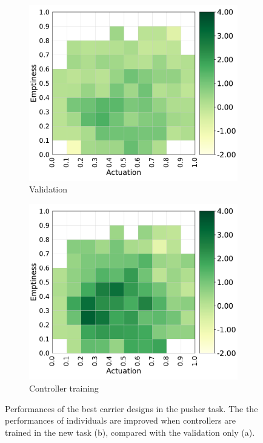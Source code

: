 \begin{figure}[H]
    \centering
    \begin{subfigure}[b]{0.49\textwidth}
         \centering
         \includegraphics[scale=0.4]{images/multitasking/carrier_val_p.pdf}
         \caption{Validation}
    \end{subfigure}
    \hfill
    \begin{subfigure}[b]{0.49\textwidth}
         \centering
         \includegraphics[scale=0.4]{images/multitasking/carrier_tr_p.pdf}
         \caption{Controller training}
    \end{subfigure}
    \caption{Performances of the best carrier designs in the pusher task.  The the performances of individuals are improved when controllers are trained in the new task (b), compared with the validation only (a).}
    \label{fig:carrier_val_tr}
 \end{figure}

